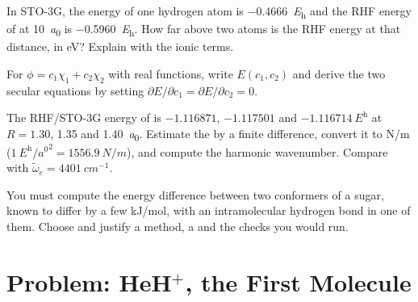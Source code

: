 \begin{exercise}[$\star\star$]\label{exo:b3:computational-chemistry:9}
In STO-3G, the energy of one hydrogen atom is \qty{-0.4666}{\hartree} and the RHF
energy of  at \qty{10}{\bohr} is \qty{-0.5960}{\hartree}. How far above two
atoms is the RHF energy at that distance, in eV? Explain with the ionic
terms.
\end{exercise}

\begin{exercise}[$\star\star\star$]\label{exo:b3:computational-chemistry:10}
For $\phi = c_1\chi_1 + c_2\chi_2$ with real functions, write $E(c_1,c_2)$ and
derive the two secular equations by setting $\partial E/\partial c_1 =
\partial E/\partial c_2 = 0$.
\end{exercise}

\begin{exercise}[$\star\star\star$]\label{exo:b3:computational-chemistry:11}
The RHF/STO-3G energy of  is $-1.116871$, $-1.117501$ and
$\qty{-1.116714}{\hartree}$ at $R = 1.30$, 1.35 and \qty{1.40}{\bohr}. Estimate
the  by a finite difference, convert it to \unit{N/m}
($\qty{1}{\hartree\per\bohr\squared} = \qty{1556.9}{N/m}$), and compute the
harmonic wavenumber. Compare with $\tilde\omega_e = \qty{4401}{cm^{-1}}$.
\end{exercise}

\begin{exercise}[$\star\star\star$]\label{exo:b3:computational-chemistry:12}
You must compute the energy difference between two conformers of a sugar,
known to differ by a few \unit{kJ/mol}, with an intramolecular hydrogen bond
in one of them. Choose and justify a method, a  and the checks you
would run.
\end{exercise}

\section{Problem: HeH\texorpdfstring{$^+$}{+}, the First Molecule}

